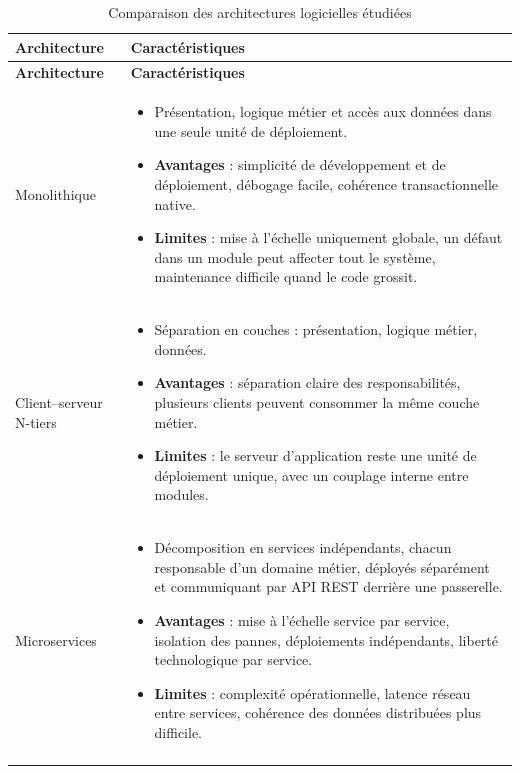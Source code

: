 \begin{longtable}{|>{\raggedright\arraybackslash}p{3.2cm}|>{\raggedright\arraybackslash}p{11cm}|}
\hline
\textbf{Architecture} & \textbf{Caractéristiques} \\
\hline
\endfirsthead
\hline
\textbf{Architecture} & \textbf{Caractéristiques} \\
\hline
\endhead
Monolithique &
\begin{itemize}[leftmargin=*, nosep]
    \item Présentation, logique métier et accès aux données dans une seule unité de déploiement.
    \item \textbf{Avantages} : simplicité de développement et de déploiement, débogage facile, cohérence transactionnelle native.
    \item \textbf{Limites} : mise à l'échelle uniquement globale, un défaut dans un module peut affecter tout le système, maintenance difficile quand le code grossit.
\end{itemize} \\
\hline
Client--serveur N-tiers &
\begin{itemize}[leftmargin=*, nosep]
    \item Séparation en couches : présentation, logique métier, données.
    \item \textbf{Avantages} : séparation claire des responsabilités, plusieurs clients peuvent consommer la même couche métier.
    \item \textbf{Limites} : le serveur d'application reste une unité de déploiement unique, avec un couplage interne entre modules.
\end{itemize} \\
\hline
Microservices &
\begin{itemize}[leftmargin=*, nosep]
    \item Décomposition en services indépendants, chacun responsable d'un domaine métier, déployés séparément et communiquant par API REST derrière une passerelle.
    \item \textbf{Avantages} : mise à l'échelle service par service, isolation des pannes, déploiements indépendants, liberté technologique par service.
    \item \textbf{Limites} : complexité opérationnelle, latence réseau entre services, cohérence des données distribuées plus difficile.
\end{itemize} \\
\hline
\caption{Comparaison des architectures logicielles étudiées}
\label{tab:comparaison_architectures}
\end{longtable}

